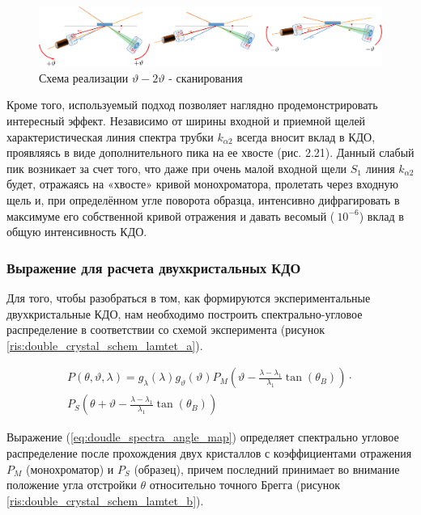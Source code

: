  \begin{figure}[H]
   \centering
   \includegraphics[width=1\textwidth]{images/theta_2theta_scan.png}
   \caption{Схема реализации $\vartheta - 2\vartheta$ - сканирования}
   \label{ris:theta_2theta_scan}
 \end{figure}
Кроме того, используемый подход позволяет наглядно продемонстрировать интересный эффект.
 Независимо от ширины входной и приемной щелей характеристическая линия спектра
 трубки $k_{\alpha 2}$ всегда вносит вклад в КДО, проявляясь в виде дополнительного
 пика на ее хвосте (рис. 2.21). Данный слабый пик возникает за счет того, что
 даже при очень малой входной щели $S_1$ линия $k_{\alpha 2}$ будет, отражаясь на «хвосте»
 кривой монохроматора, пролетать через входную щель и, при определённом угле
 поворота образца, интенсивно дифрагировать в максимуме его собственной кривой
 отражения и давать весомый ($~10^{-6}$) вклад в общую интенсивность КДО.


\subsubsection{Выражение для расчета двухкристальных КДО}

Для того, чтобы разобраться в том, как формируются экспериментальные
двухкристальные КДО, нам необходимо построить спектрально-угловое распределение
в соответствии со схемой эксперимента (рисунок \ref{ris:double_crystal_schem_lamtet_a}).

\begin{eqnarray} \label{eq:doudle_spectra_angle_map}
  P(\theta,\vartheta,\lambda) = g_{\lambda}(\lambda)g_{\vartheta}(\vartheta) P_M \left(\vartheta - \frac{\lambda - \lambda_1}{\lambda_1}\tan(\theta_B) \right) \cdot \nonumber \\
   P_S \left(\theta + \vartheta - \frac{\lambda - \lambda_1}{\lambda_1}\tan(\theta_B)\right)
 \end{eqnarray}

Выражение (\ref{eq:doudle_spectra_angle_map}) определяет спектрально угловое распределение после прохождения двух кристаллов с
коэффициентами отражения  $P_M$ (монохроматор) и $P_S$ (образец), причем последний принимает во внимание положение угла отстройки $\theta$ относительно
точного Брегга (рисунок \ref{ris:double_crystal_schem_lamtet_b}).

